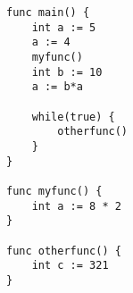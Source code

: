 \begin{lstlisting}[caption={}, label={}]
func main() {
	int a := 5
	a := 4
	myfunc()
	int b := 10
	a := b*a
	
	while(true) {
		otherfunc()
	}
}

func myfunc() {
	int a := 8 * 2
}

func otherfunc() {
	int c := 321
}
\end{lstlisting}